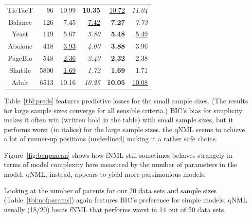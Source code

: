 \begin{table}
\begin{center}
\begin{tabular}{crrrrr}
 TicTacT &    96 &             10.99 &    \textbf{10.35} &  \underline{10.72} &     \textit{11.04} \\
 Balance &   126 &              7.45 &  \underline{7.42} &      \textbf{7.27} &      \textit{7.73} \\
   Yeast &   149 &              5.67 &     \textit{5.80} &      \textbf{5.48} &   \underline{5.49} \\
 Abalone &   418 &  \underline{3.93} &     \textit{4.00} &      \textbf{3.88} &               3.96 \\
 PageBlo &   548 &  \underline{2.36} &     \textit{2.40} &      \textbf{2.32} &               2.38 \\
 Shuttle &  5800 &  \underline{1.69} &     \textit{1.72} &      \textbf{1.69} &               1.71 \\
   Adult &  6513 &             10.16 &    \textit{10.25} &     \textbf{10.05} &  \underline{10.08} \\
\end{tabular}
\end{center}
\end{table}

Table~\ref{tbl:preds} features predictive losses for the small sample
sizes.  (The results for large sample sizes converge for all sensible
criteria.) BIC's bias for simplicity makes it often win (written bold
in the table) with small sample sizes, but it performs worst (in
italics) for the large sample sizes. the qNML seems to achieve a lot
of runner-up positions (underlined) making it a rather safe choice.

Figure~\ref{fig:bcnpmean} shows how fNML still sometimes behaves
strangely in terms of model complexity here measured by the number of
parameters in the model. qNML, instead, appears to yield more
parsimonious models.

Looking at the number of parents for our 20 data sets and sample
sizes (Table~\ref{tbl:nofparams}) again features BIC's preference for
simple models. qNML usually (18/20) beats fNML that performs worst in
14 out of 20 data sets.


